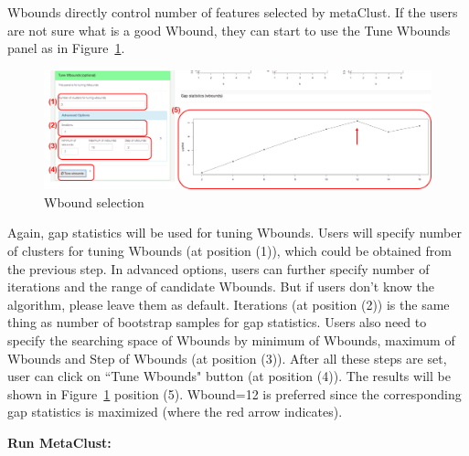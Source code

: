 \begin{steps}
Wbounds directly control number of features selected by metaClust.
If the users are not sure what is a good Wbound,
they can start to use the Tune Wbounds panel as in Figure~\ref{fig:metaClusttuneW}.
\begin{figure}[H]
\begin{center}
\includegraphics[scale=0.5]{./figure/metaClust/tuneW.pdf}
\caption{Wbound selection}
\label{fig:metaClusttuneW}
\end{center}
\end{figure}
Again,
gap statistics will be used for tuning Wbounds.
Users will specify number of clusters for tuning Wbounds (at position {\color{red} (1)}), which could be obtained from the previous step.
In advanced options, users can further specify number of iterations and the range of candidate Wbounds.
But if users don't know the algorithm, please leave them as default.
Iterations (at position {\color{red} (2)}) is the same thing as number of bootstrap samples for gap statistics.
Users also need to specify the searching space of Wbounds by minimum of Wbounds, maximum of Wbounds and Step of Wbounds (at position {\color{red} (3)}).
After all these steps are set,
user can click on ``Tune Wbounds" button (at position {\color{red} (4)}).
The results will be shown in Figure~\ref{fig:metaClusttuneW}  position {\color{red} (5)}.
Wbound=12 is preferred since the corresponding gap statistics is maximized (where the red arrow indicates).

\item \textbf{Run MetaClust:} 


\end{steps}
